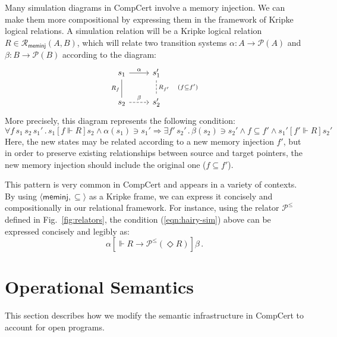 \documentclass[sigplan,10pt,review,anonymous]{acmart}
\newcommand{\kw}[1]{\ensuremath{ \mathsf{#1} }}
\newcommand{\ifr}[1]{\mathrel{[{#1}]}}
\begin{document}
\begin{example} \label{ex:sim} %
Many simulation diagrams in CompCert
involve a memory injection.
We can make them more compositional by
expressing them in the framework of Kripke logical relations.
A simulation relation will be a Kripke logical relation
$R \in \mathcal{R}_\kw{meminj}(A, B)$,
which will relate two transition systems
$\alpha : A \rightarrow \mathcal{P}(A)$ and
$\beta : B \rightarrow \mathcal{P}(B)$
according to the diagram:
\[
  \begin{tikzcd}
    s_1 \arrow[r, "\alpha"]
        \arrow[d, dash, "R_f"'] &
    s_1' \arrow[d, dashed, dash, "R_{f'} \quad (f \subseteq f')"] \\
    s_2 \arrow[r, dashed, "\beta"] &
    s_2'
  \end{tikzcd}
\]
More precisely, this diagram represents the following condition:
\begin{equation}
    \label{eqn:hairy-sim}
    \forall f \, s_1 \, s_2 \, s_1' \,.\,
      s_1 \ifr{f \Vdash R} s_2 \wedge
      \alpha(s_1) \ni s_1' \Rightarrow
    \exists f' \, s_2' \,.\,
      \beta(s_2) \ni s_2' \wedge
      f \subseteq f' \wedge
      s_1' \ifr{f' \Vdash R} s_2'
\end{equation}
Here, the new states may be related according to
a new memory injection $f'$,
but in order to preserve existing relationships
between source and target pointers,
the new memory injection should include
the original one ($f \subseteq f'$).

This pattern is very common in CompCert
and appears in a variety of contexts.
By using $\langle \kw{meminj}, {\subseteq} \rangle$
as a Kripke frame,
we can express it concisely and compositionally
in our relational framework.
For instance,
using the relator $\mathcal{P}^\le$ defined in
Fig.~\ref{fig:relators},
the condition (\ref{eqn:hairy-sim}) above can be expressed
concisely and legibly as:
\[
  \alpha \ifr{\Vdash R \rightarrow \mathcal{P}^\le(\Diamond R)} \beta \,.
\]
\end{example}



\section{Operational Semantics} \label{sec:sem} %

This section describes how we modify
the semantic infrastructure in CompCert
to account for open programs.
\end{document}
